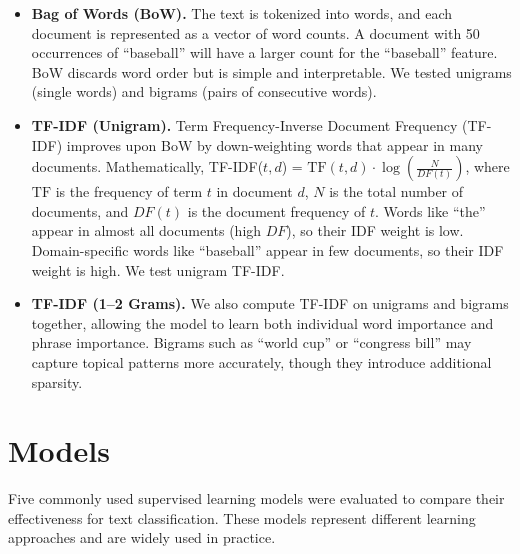\documentclass[12pt]{article}
\begin{document}
\begin{itemize}
  \item \textbf{Bag of Words (BoW).} The text is tokenized into words, and each document is represented as a vector of word counts. A document with 50 occurrences of ``baseball'' will have a larger count for the ``baseball'' feature. BoW discards word order but is simple and interpretable. We tested unigrams (single words) and bigrams (pairs of consecutive words).
  
\item \textbf{TF-IDF (Unigram).} Term Frequency-Inverse Document Frequency (TF-IDF) improves upon BoW by down-weighting words that appear in many documents. Mathematically, TF-IDF($t, d$) = $\text{TF}(t, d) \cdot \log(\frac{N}{DF(t)})$, where $\text{TF}$ is the frequency of term $t$ in document $d$, $N$ is the total number of documents, and $DF(t)$ is the document frequency of $t$. Words like ``the'' appear in almost all documents (high $DF$), so their IDF weight is low. Domain-specific words like ``baseball'' appear in few documents, so their IDF weight is high. We test unigram TF-IDF.
  
  \item \textbf{TF-IDF (1--2 Grams).} We also compute TF-IDF on unigrams and bigrams together, allowing the model to learn both individual word importance and phrase importance. Bigrams such as ``world cup'' or ``congress bill'' may capture topical patterns more accurately, though they introduce additional sparsity.
\end{itemize}


\section{Models}

Five commonly used supervised learning models were evaluated to compare their effectiveness for text classification. These models represent different learning approaches and are widely used in practice.
\end{document}
